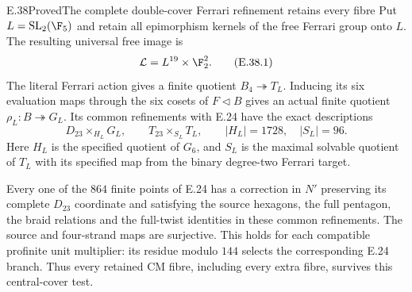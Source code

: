 \begin{statement}{E.38}{Proved}{The complete double-cover Ferrari refinement retains every fibre}
Put $L=\operatorname{SL}_2(\F_5)$ and retain all epimorphism
kernels of the free Ferrari group onto $L$.  The resulting
universal free image is
\[
             \mathcal L=L^{19}\times\F_2^2.
 \tag{E.38.1}
\]
The literal Ferrari action gives a finite quotient
$B_4\twoheadrightarrow T_L$.  Inducing its six evaluation
maps through the six cosets of $F\lhd B$ gives an actual
finite quotient $\rho_L:B\twoheadrightarrow G_L$.
Its common refinements with E.24 have the exact descriptions
\[
 D_{23}\mathbin{\times_{H_L}}G_L,
 \qquad
 T_{23}\mathbin{\times_{S_L}}T_L,
 \qquad |H_L|=1728,
 \quad |S_L|=96.
 \tag{E.38.2}
\]
Here $H_L$ is the specified quotient of $G_6$, and $S_L$
is the maximal solvable quotient of $T_L$ with its
specified map from the binary degree-two Ferrari target.

Every one of the $864$ finite points of E.24 has a correction
in $N'$ preserving its complete $D_{23}$ coordinate and
satisfying the source hexagons, the full pentagon, the braid
relations and the full-twist identities in these common
refinements.  The source and four-strand maps are surjective.
This holds for each compatible profinite unit multiplier:
its residue modulo $144$ selects the corresponding E.24
branch.  Thus every retained CM fibre, including every extra
fibre, survives this central-cover test.
\end{statement}
